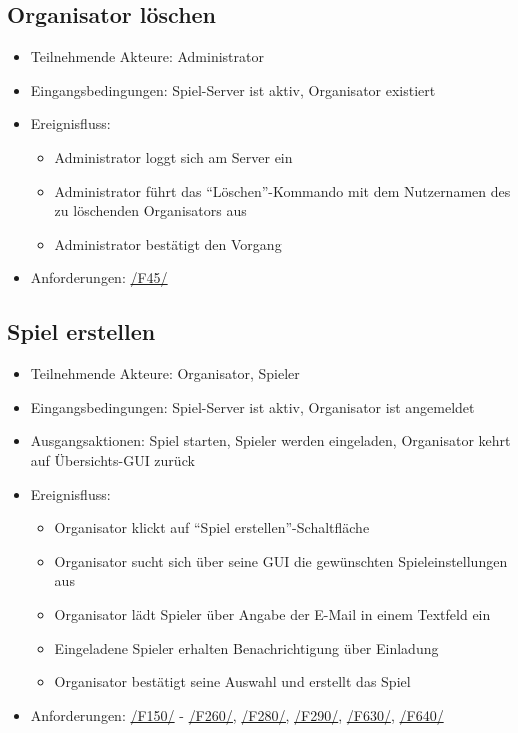 \documentclass[a4paper]{scrreprt}
\begin{document}
    \subsection{Organisator löschen}
    \begin{itemize}
        \item Teilnehmende Akteure: \Gls{Administrator}
        \item Eingangsbedingungen: \Gls{Spiel-Server} ist aktiv, \Gls{Organisator} existiert
        \item Ereignisfluss:
        \begin{itemize}
            \item \Gls{Administrator} loggt sich am Server ein
            \item \Gls{Administrator} führt das \enquote{Löschen}-Kommando mit dem Nutzernamen des zu löschenden \Gls{Organisator}s aus
            \item \Gls{Administrator} bestätigt den Vorgang
        \end{itemize}
        \item Anforderungen: \hyperlink{F45}{/F45/}
    \end{itemize}

    \subsection{Spiel erstellen}
    \begin{itemize}
        \item Teilnehmende Akteure: \Gls{Organisator}, \Gls{Spieler}
        \item Eingangsbedingungen: \Gls{Spiel-Server} ist aktiv, \Gls{Organisator} ist angemeldet
        \item Ausgangsaktionen: \Gls{Spiel} starten, \Gls{Spieler} werden eingeladen, \Gls{Organisator} kehrt auf Übersichts-GUI zurück
        \item Ereignisfluss:
        \begin{itemize}
            \item \Gls{Organisator} klickt auf \enquote{Spiel erstellen}-Schaltfläche
            \item \Gls{Organisator} sucht sich über seine GUI die gewünschten \Gls{Spieleinstellungen} aus
            \item \Gls{Organisator} lädt \Gls{Spieler} über Angabe der E-Mail in einem Textfeld ein
            \item Eingeladene \Gls{Spieler} erhalten Benachrichtigung über Einladung
            \item \Gls{Organisator} bestätigt seine Auswahl und erstellt das Spiel
        \end{itemize}
        \item Anforderungen: \hyperlink{F150}{/F150/} - \hyperlink{F260}{/F260/,} \hyperlink{F280}{/F280/,} \hyperlink{F290}{/F290/}, \hyperlink{F630}{/F630/}, \hyperlink{F640}{/F640/}
    \end{itemize}
\end{document}
